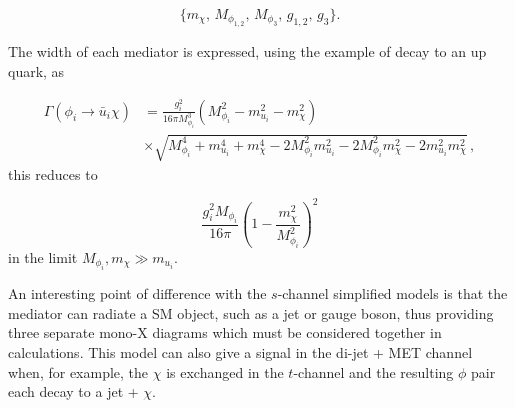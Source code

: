 \begin{equation}
\{ m_{\chi},\, M_{\phi_{1,2}},\,M_{\phi_3},\, g_{1,2},\, g_3\}.
\end{equation}

\vspace{5mm}

The width of each mediator is expressed, using the example of decay to an up quark, as

\begin{equation}
\begin{split}
\Gamma (\phi_i \rightarrow \bar{u}_i \chi) &= \frac{g_i^2}{16 \pi M_{\phi_i}^3}(M_{\phi_i}^2 - m_{u_i}^2 - m_{\chi}^2) 		\\
					   & \times \sqrt{M_{\phi_i}^4 + m_{u_i}^4 + m_{\chi}^4 - 2M_{\phi_i}^2m_{u_i}^2 - 2M_{\phi_i}^2m_{\chi}^2 - 2m_{u_i}^2m_{\chi}^2} \, ,
\end{split}
\end{equation}
this reduces to 

\begin{equation}
\frac{g_i^2 M_{\phi_i}}{16 \pi} \left(1 - \frac{m_{\chi}^2}{M_{\phi_i}^2} \right)^2
\end{equation}
in the limit $M_{\phi_i}, m_{\chi} \gg m_{u_i}$.

\vspace{5mm}

An interesting point of difference with the $s$-channel simplified models is that the mediator can radiate a SM object, such as a jet or gauge boson, thus providing three separate mono-X diagrams which must be considered together in calculations. This model can also give a signal in the di-jet + MET channel when, for example, the $\chi$ is exchanged in the $t$-channel and the resulting $\phi$ pair each decay to a jet + $\chi$. 
